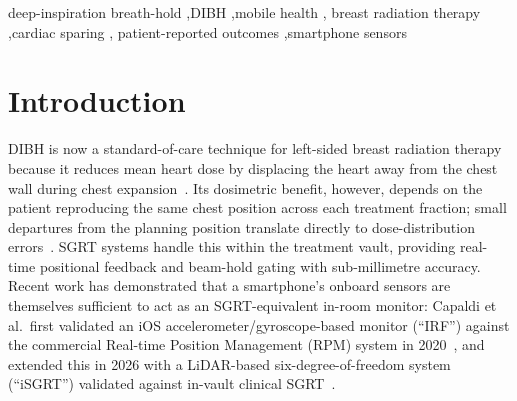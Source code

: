 \documentclass[3p,times]{elsarticle}
\begin{document}
\begin{frontmatter}
\begin{abstract}
\textbf{Results.} Two illustrative recordings (single subject, Apple
iPhone, iOS Safari) demonstrate the design. With the phone laid flat
and centered on the abdomen (belly-only breathing), normal-breathing
pitch SD was 0.81$^{\circ}$ and in-hold pitch SD 0.07$^{\circ}$ (11$\times$
ratio); peak inhale pitch deviation was small (5$^{\circ}$). With the
phone bridging from sternum to upper belly (chest-led DIBH-style
breathing), normal-breathing SD was 0.99$^{\circ}$ and in-hold SD
0.13$^{\circ}$ (6$\times$ ratio); peak inhale pitch deviation rose to
14$^{\circ}$. The sternum-bridging placement therefore yielded
substantially larger absolute signal at modest cost in in-hold
quietness. The adaptive threshold cleanly separated breathing from
holds in both modes.

\textbf{Conclusions.} A consumer smartphone, delivered through a
browser without any add-on hardware, can capture sufficient signal
for at-home DIBH reproducibility coaching. Tide complements rather
than replaces in-clinic SGRT systems by addressing the between-fraction
practice gap. Forthcoming work will validate Tide in a single-arm
feasibility cohort against simulator-day plateau reproducibility.
\end{abstract}

\begin{keyword}
deep-inspiration breath-hold \sep DIBH \sep mobile health \sep
breast radiation therapy \sep cardiac sparing \sep
patient-reported outcomes \sep smartphone sensors
\end{keyword}

\end{frontmatter}

\section{Introduction}

DIBH is now a standard-of-care technique for left-sided breast
radiation therapy because it reduces mean heart dose by displacing
the heart away from the chest wall during chest
expansion~\cite{darby2013ischemic,piroth2019heart}. Its dosimetric
benefit, however, depends on the patient reproducing the same chest
position across each treatment fraction; small departures from the
planning position translate directly to dose-distribution
errors~\cite{tang2015dosimetric}. SGRT systems handle this within
the treatment vault, providing real-time positional feedback and
beam-hold gating with sub-millimetre accuracy. Recent work has
demonstrated that a smartphone's onboard sensors are themselves
sufficient to act as an SGRT-equivalent in-room monitor: Capaldi et
al.\ first validated an iOS accelerometer/gyroscope-based monitor
(``IRF'') against the commercial Real-time Position Management
(RPM) system in 2020~\cite{capaldi2020}, and extended this in 2026
with a LiDAR-based six-degree-of-freedom system (``iSGRT'')
validated against in-vault clinical SGRT~\cite{capaldi2026}.
\end{document}
